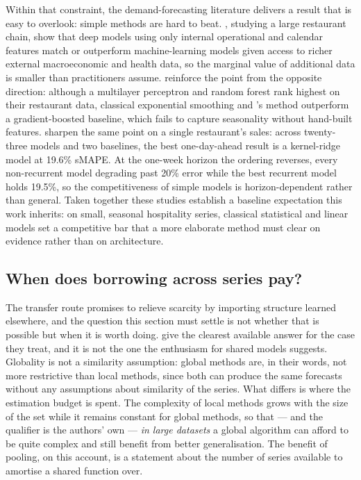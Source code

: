 Within that constraint, the demand-forecasting literature delivers a result
that is easy to overlook: simple methods are hard to beat.
\citet{chae_value_2024}, studying a large restaurant chain, show that deep
models using only internal operational and calendar features match or
outperform machine-learning models given access to richer external
macroeconomic and health data, so the marginal value of additional data is
smaller than practitioners assume. \citet{hossain_comparative_2025}
reinforce the point from the opposite direction: although a multilayer
perceptron and random forest rank highest on their restaurant data, classical
exponential smoothing and \citet{croston_forecasting_1972}'s method outperform
a gradient-boosted baseline, which fails to capture seasonality without
hand-built features. \citet{schmidt_machine_2022} sharpen the same point on a
single restaurant's sales: across twenty-three models and two baselines, the
best one-day-ahead result is a kernel-ridge model at 19.6\% sMAPE. At the
one-week horizon the ordering reverses, every non-recurrent model degrading
past 20\% error while the best recurrent model holds 19.5\%, so the
competitiveness of simple models is horizon-dependent rather than general.
Taken together these studies establish a baseline expectation this work
inherits: on small, seasonal hospitality series, classical statistical and
linear models set a competitive bar that a more elaborate method must clear on
evidence rather than on architecture.

\subsection*{When does borrowing across series pay?}

The transfer route promises to relieve scarcity by importing structure learned
elsewhere, and the question this section must settle is not whether that is
possible but when it is worth doing.
\citet{montero-manso_principles_2021} give the clearest available answer for
the case they treat, and it is not the one the enthusiasm for shared models
suggests. Globality is not a similarity assumption: global methods are, in
their words, not more restrictive than local methods, since both can produce
the same forecasts without any assumptions about similarity of the series.
What differs is where the estimation budget is spent. The complexity of local
methods grows with the size of the set while it remains constant for global
methods, so that --- and the qualifier is the authors' own --- \emph{in large
datasets} a global algorithm can afford to be quite complex and still benefit
from better generalisation. The benefit of pooling, on this account, is a
statement about the number of series available to amortise a shared function
over.


